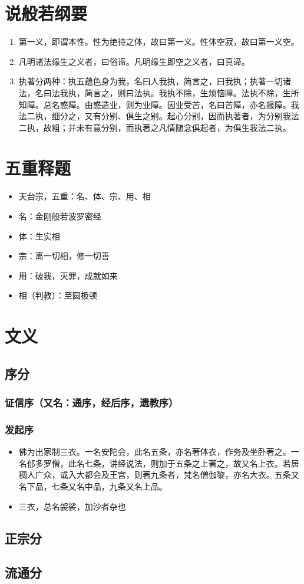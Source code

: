 \documentclass[11pt]{article}
\author{Johnny Zhang}
\date{\today}
\title{}
\begin{document}
\section{说般若纲要}
\label{sec:org2c5a7e9}
\begin{enumerate}
\item 第一义，即谓本性。性为绝待之体，故曰第一义。性体空寂，故曰第一义空。
\item 凡明诸法缘生之义者，曰俗谛。凡明缘生即空之义者，曰真谛。
\item 执著分两种：执五蕴色身为我，名曰人我执，简言之，曰我执；执著一切诸法，名曰法我执，简言之，则曰法执。我执不除，生烦恼障。法执不除，生所知障。总名惑障。由惑造业，则为业障。因业受苦，名曰苦障，亦名报障。我法二执，细分之，又有分别、俱生之别。起心分别，因而执著者，为分别我法二执，故粗；并未有意分别，而执著之凡情随念俱起者，为俱生我法二执。
\end{enumerate}

\section{五重释题}
\label{sec:org169889a}
\begin{itemize}
\item 天台宗，五重：名、体、宗、用、相
\item 名：金刚般若波罗密经
\item 体：生实相
\item 宗：离一切相，修一切善
\item 用：破我，灭罪，成就如来
\item 相（判教）：至圆极顿
\end{itemize}

\section{文义}
\label{sec:orgbcc13ac}
\subsection{序分}
\label{sec:orgff0515d}
\subsubsection{证信序（又名：通序，经后序，遗教序）}
\label{sec:org9760c8d}
\subsubsection{发起序}
\label{sec:org7725812}
\begin{itemize}
\item 佛为出家制三衣。一名安陀会，此名五条，亦名著体衣，作务及坐卧著之。一名郁多罗僧，此名七条，讲经说法，则加于五条之上著之，故又名上衣。若居稠人广众，或入大都会及王宫，则著九条者，梵名僧伽黎，亦名大衣。五条又名下品，七条又名中品，九条又名上品。
\item 三衣，总名袈裟，加沙者杂也
\end{itemize}
\subsection{正宗分}
\label{sec:org5c2afbe}
\subsection{流通分}
\label{sec:orgd5d1c5e}
\end{document}
